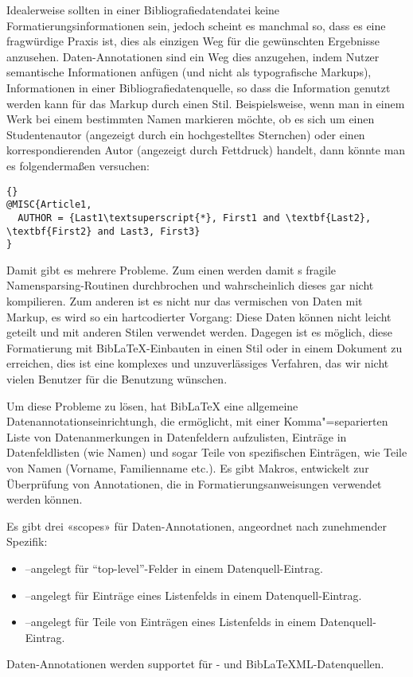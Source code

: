 \documentclass{ltxdockit}[2011/03/25]
\newcommand*{\biblatex}{BibLaTeX\xspace}
\newcommand*{\biblatexml}{BibLaTeXML\xspace}
\begin{document}
Idealerweise sollten in einer Bibliografiedatendatei keine Formatierungsinformationen
sein, jedoch scheint es manchmal so, dass es eine fragwürdige Praxis ist, dies als
einzigen Weg für die gewünschten Ergebnisse anzusehen. Daten-Annotationen sind ein Weg
dies anzugehen, indem Nutzer semantische Informationen anfügen (und nicht als
typografische Markups), Informationen in einer Bibliografiedatenquelle, so dass
die Information genutzt werden kann für das Markup durch einen Stil. 
Beispielsweise, wenn man in einem Werk bei einem bestimmten Namen markieren möchte,
ob es sich um einen Studentenautor (angezeigt durch ein hochgestelltes Sternchen)
oder einen korrespondierenden Autor (angezeigt durch Fettdruck) handelt, dann könnte 
man es folgendermaßen versuchen: 
\
\begin{lstlisting}[style=bibtex]{}
@MISC{Article1,
  AUTHOR = {Last1\textsuperscript{*}, First1 and \textbf{Last2}, \textbf{First2} and Last3, First3}
}
\end{lstlisting}
%
Damit gibt es mehrere Probleme. Zum einen werden damit \bibtex s fragile 
Namensparsing-Routinen durchbrochen und wahrscheinlich dieses gar nicht kompilieren. 
Zum anderen ist es nicht nur das vermischen von Daten mit Markup, 
es wird so ein hartcodierter Vorgang: Diese Daten können nicht leicht geteilt und mit anderen Stilen verwendet werden. Dagegen ist es möglich, diese Formatierung mit 
\biblatex-Einbauten in einen Stil oder in einem Dokument zu erreichen, dies ist eine komplexes und unzuverlässiges Verfahren, das wir nicht vielen Benutzer für die Benutzung wünschen. 

Um diese Probleme zu lösen, hat \biblatex eine allgemeine Datenannotationseinrichtungh,
die ermöglicht, mit einer Komma"=separierten Liste von Datenanmerkungen in Datenfeldern
aufzulisten, Einträge in Datenfeldlisten (wie Namen) und sogar Teile von spezifischen Einträgen, wie Teile von Namen (Vorname, Familienname etc.). Es gibt Makros,
entwickelt zur Überprüfung von Annotationen, die in Formatierungsanweisungen verwendet
werden können.

Es gibt drei «scopes» für Daten-Annotationen, angeordnet nach zunehmender Spezifik:

\begin{itemize}
\item {}--angelegt für "`top-level"'-Felder in einem Datenquell-Eintrag. 
\item \opt{item}--angelegt für Einträge eines Listenfelds in einem Datenquell-Eintrag.  
\item \opt{part}--angelegt für Teile von Einträgen eines Listenfelds in einem 
Datenquell-Eintrag.
\end{itemize}
%
Daten-Annotationen werden supportet für \bibtex- und \biblatexml-Datenquellen.
\end{document}
